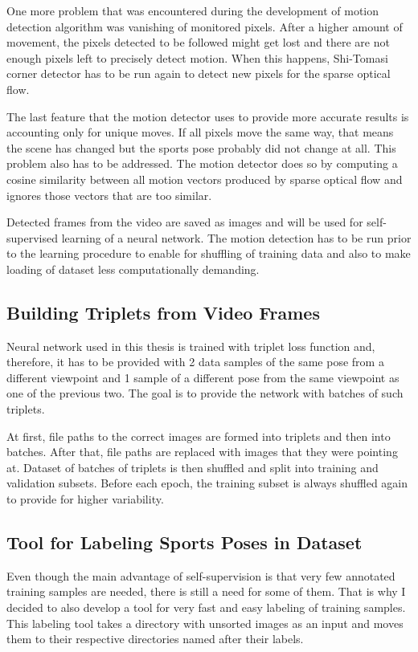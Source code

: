 One more problem that was encountered during the development of motion detection algorithm was vanishing of monitored pixels. After a higher amount of movement, the pixels detected to be followed might get lost and there are not enough pixels left to precisely detect motion. When this happens, Shi-Tomasi corner detector has to be run again to detect new pixels for the sparse optical flow.

The last feature that the motion detector uses to provide more accurate results is accounting only for unique moves. If all pixels move the same way, that means the scene has changed but the sports pose probably did not change at all. This problem also has to be addressed. The motion detector does so by computing a cosine similarity between all motion vectors produced by sparse optical flow and ignores those vectors that are too similar.

Detected frames from the video are saved as images and will be used for self-supervised learning of a neural network. The motion detection has to be run prior to the learning procedure to enable for shuffling of training data and also to make loading of dataset less computationally demanding.

\subsection{Building Triplets from Video Frames}

Neural network used in this thesis is trained with triplet loss function and, therefore, it has to be provided with 2 data samples of the same pose from a different viewpoint and 1 sample of a different pose from the same viewpoint as one of the previous two. The goal is to provide the network with batches of such triplets.

At first, file paths to the correct images are formed into triplets and then into batches. After that, file paths are replaced with images that they were pointing at. Dataset of batches of triplets is then shuffled and split into training and validation subsets. Before each epoch, the training subset is always shuffled again to provide for higher variability.

\subsection{\label{sec:dataset-label-tool}Tool for Labeling Sports Poses in Dataset}

Even though the main advantage of self-supervision is that very few annotated training samples are needed, there is still a need for some of them. That is why I decided to also develop a tool for very fast and easy labeling of training samples. This labeling tool takes a directory with unsorted images as an input and moves them to their respective directories named after their labels.

